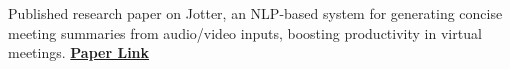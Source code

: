 \item
{Published research paper on Jotter, an NLP-based system for generating concise meeting summaries from audio/video inputs, boosting productivity in virtual meetings. }{\href{https://ieeexplore.ieee.org/document/10390455}{\textbf{Paper Link}} }
